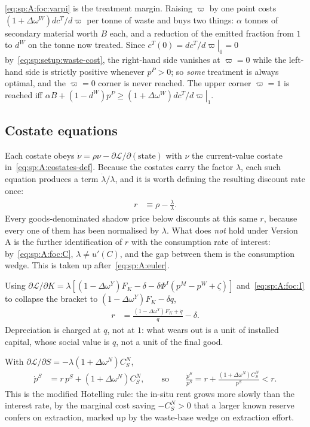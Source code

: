 \eqref{eq:sp:A:foc:varpi} is the treatment margin. Raising $\varpi$ by one point costs
$\left(1+\Delta\omega^W\right)dc^T/d\varpi$ per tonne of waste and buys two things: $\alpha$ tonnes of
secondary material worth $B$ each, and a reduction of the emitted fraction from $1$ to
$d^W$ on the tonne now treated. Since $c^T(0)=\left.dc^T/d\varpi\right|_{0}=0$
by~\eqref{eq:sp:setup:waste-cost}, the right-hand side vanishes at $\varpi=0$ while the left-hand side
is strictly positive whenever $p^P>0$; so \emph{some} treatment is always optimal, and the $\varpi=0$
corner is never reached. The upper corner $\varpi=1$ is reached iff
$\alpha B+\left(1-d^W\right)p^P\ge\left(1+\Delta\omega^W\right)\left.dc^T/d\varpi\right|_{1}$.


\subsection{Costate equations}\label{sec:sp:A:costates}

Each costate obeys $\dot\nu=\rho\nu-\partial\mathcal L/\partial(\text{state})$ with $\nu$ the
current-value costate in~\eqref{eq:sp:A:costates-def}. Because the costates carry the factor
$\lambda$, each such equation produces a term $\dot\lambda/\lambda$, and it is worth defining the
resulting discount rate once:
\begin{align}
r &\equiv \rho-\frac{\dot\lambda}{\lambda}.
\label{eq:sp:A:r}
\end{align}
Every goods-denominated shadow price below discounts at this same $r$, because every one of them has
been normalised by $\lambda$. What does \emph{not} hold under Version A is the further identification
of $r$ with the consumption rate of interest: by~\eqref{eq:sp:A:foc:C}, $\lambda\ne u'(C)$, and the
gap between them is the consumption wedge. This is taken up
after~\eqref{eq:sp:A:euler}.

 Using
$\partial\mathcal L/\partial K=\lambda\left[\left(1-\Delta\omega^Y\right)F_K-\delta
-\delta\Phi^I\left(p^M-p^W+\zeta\right)\right]$ and~\eqref{eq:sp:A:foc:I} to collapse the bracket to
$\left(1-\Delta\omega^Y\right)F_K-\delta q$,
\begin{align}
r &= \frac{\left(1-\Delta\omega^Y\right)F_K+\dot q}{q}-\delta .
\label{eq:sp:A:costate:K}
\end{align}
Depreciation is charged at $q$, not at $1$: what wears out is a unit of installed capital, whose
social value is $q$, not a unit of the final good.

 With
$\partial\mathcal L/\partial S=-\lambda\left(1+\Delta\omega^N\right)C^N_S$,
\begin{align}
\dot p^S &= r\,p^S+\left(1+\Delta\omega^N\right)C^N_S,
\qquad\text{so}\qquad
\frac{\dot p^S}{p^S} = r+\frac{\left(1+\Delta\omega^N\right)C^N_S}{p^S}<r .
\label{eq:sp:A:costate:S}
\end{align}
This is the modified Hotelling rule: the in-situ rent grows more slowly than the interest rate, by
the marginal cost saving $-C^N_S>0$ that a larger known reserve confers on extraction, marked up by
the waste-base wedge on extraction effort.

